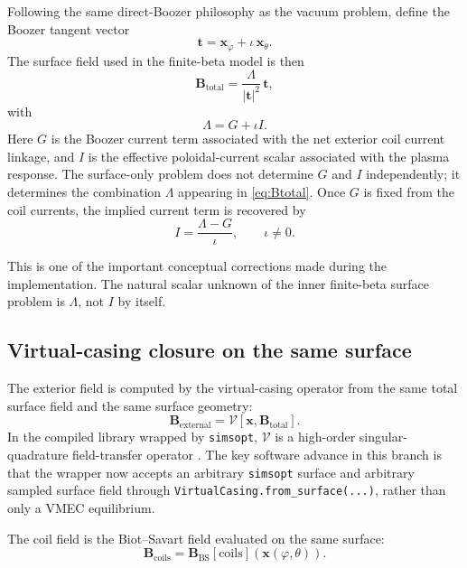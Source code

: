 \documentclass[11pt]{article}
\begin{document}
Following the same direct-Boozer philosophy as the vacuum problem, define the Boozer tangent vector
\begin{equation}
  \mathbf{t} = \mathbf{x}_{\varphi} + \iota \, \mathbf{x}_{\theta}.
\end{equation}
The surface field used in the finite-beta model is then
\begin{equation}
  \mathbf{B}_{\mathrm{total}} = \frac{\Lambda}{|\mathbf{t}|^2} \, \mathbf{t},
  \label{eq:Btotal}
\end{equation}
with
\begin{equation}
  \Lambda = G + \iota I.
\end{equation}
Here $G$ is the Boozer current term associated with the net exterior coil current linkage, and $I$ is the effective poloidal-current scalar associated with the plasma response. The surface-only problem does not determine $G$ and $I$ independently; it determines the combination $\Lambda$ appearing in \eqref{eq:Btotal}. Once $G$ is fixed from the coil currents, the implied current term is recovered by
\begin{equation}
  I = \frac{\Lambda - G}{\iota},
  \qquad \iota \neq 0.
\end{equation}

This is one of the important conceptual corrections made during the implementation. The natural scalar unknown of the inner finite-beta surface problem is $\Lambda$, not $I$ by itself.

\subsection{Virtual-casing closure on the same surface}
The exterior field is computed by the virtual-casing operator from the same total surface field and the same surface geometry:
\begin{equation}
  \mathbf{B}_{\mathrm{external}} = \mathcal{V}[\mathbf{x}, \mathbf{B}_{\mathrm{total}}].
  \label{eq:VCoperator}
\end{equation}
In the compiled library wrapped by \texttt{simsopt}, $\mathcal{V}$ is a high-order singular-quadrature field-transfer operator \cite{Malhotra2020}. The key software advance in this branch is that the wrapper now accepts an arbitrary \texttt{simsopt} surface and arbitrary sampled surface field through \texttt{VirtualCasing.from\_surface(...)}, rather than only a VMEC equilibrium.

The coil field is the Biot--Savart field evaluated on the same surface:
\begin{equation}
  \mathbf{B}_{\mathrm{coils}} = \mathbf{B}_{\mathrm{BS}}[\text{coils}](\mathbf{x}(\varphi,\theta)).
\end{equation}
\end{document}
